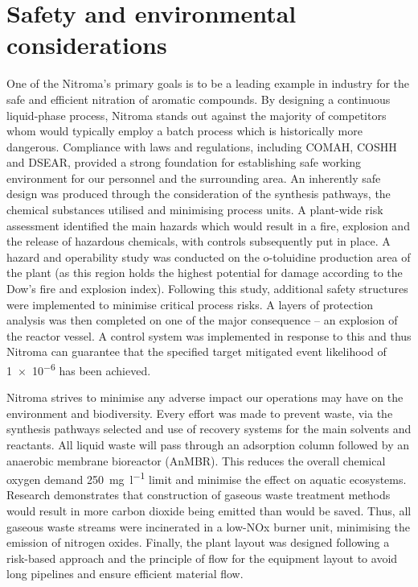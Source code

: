 \section*{Safety and environmental considerations}

 One of the Nitroma's primary goals is to be a leading example in industry for the safe and efficient nitration of aromatic compounds. By designing a continuous liquid-phase process, Nitroma stands out against the majority of competitors whom would typically employ a batch process which is historically more dangerous. Compliance with laws and regulations, including COMAH, COSHH and DSEAR, provided a strong foundation for establishing safe working environment for our personnel and the surrounding area. An inherently safe design was produced through the consideration of the synthesis pathways, the chemical substances utilised and minimising process units. A plant-wide risk assessment identified the main hazards which would result in a fire, explosion and the release of hazardous chemicals, with controls subsequently put in place. A hazard and operability study was conducted on the o-toluidine production area of the plant (as this region holds the highest potential for damage according to the Dow's fire and explosion index). Following this study, additional safety structures were implemented to minimise critical process risks. A layers of protection analysis was then completed on one of the major consequence – an explosion of the reactor vessel. A control system was implemented in response to this and thus Nitroma can guarantee that the specified target mitigated event likelihood of \num{1e-6} has been achieved.

Nitroma strives to minimise any adverse impact our operations may have on the environment and biodiversity. Every effort was made to prevent waste, via the synthesis pathways selected and use of recovery systems for the main solvents and reactants. All liquid waste will pass through an adsorption column followed by an anaerobic membrane bioreactor (AnMBR). This reduces the overall chemical oxygen demand \SI{250}{\mg\per\litre} limit and minimise the effect on aquatic ecosystems. Research demonstrates that construction of gaseous waste treatment methods would result in more carbon dioxide being emitted than would be saved. Thus, all gaseous waste streams were incinerated in a low-NOx burner unit, minimising the emission of nitrogen oxides. Finally, the plant layout was designed following a risk-based approach and the principle of flow for the equipment layout to avoid long pipelines and ensure efficient material flow. 

